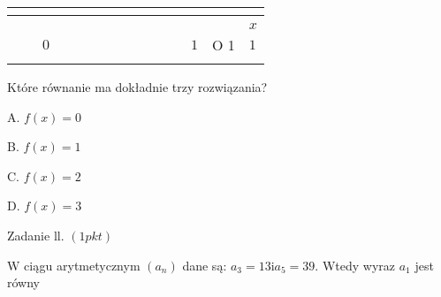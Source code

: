 \documentclass[a4paper,12pt]{article}
\begin{document}
\begin{center}
\begin{tabular}{|l|l|l|l|l|l|l|l|l|l|l|l|l|l|l|}
\hline
\multicolumn{1}{|l|}{}&	\multicolumn{1}{|l|}{}&	\multicolumn{1}{|l|}{}&	\multicolumn{1}{|l|}{}&	\multicolumn{1}{|l|}{}&	\multicolumn{1}{|l|}{}&	\multicolumn{1}{|l|}{}&	\multicolumn{1}{|l|}{}&	\multicolumn{1}{|l|}{}&	\multicolumn{1}{|l|}{}&	\multicolumn{1}{|l|}{}&	\multicolumn{1}{|l|}{}&	\multicolumn{1}{|l|}{}&	\multicolumn{1}{|l|}{}&	\multicolumn{1}{|l|}{}	\\
\hline
\multicolumn{1}{|l|}{}&	\multicolumn{1}{|l|}{}&	\multicolumn{1}{|l|}{}&	\multicolumn{1}{|l|}{}&	\multicolumn{1}{|l|}{}&	\multicolumn{1}{|l|}{}&	\multicolumn{1}{|l|}{}&	\multicolumn{1}{|l|}{}&	\multicolumn{1}{|l|}{}&	\multicolumn{1}{|l|}{}&	\multicolumn{1}{|l|}{}&	\multicolumn{1}{|l|}{}&	\multicolumn{1}{|l|}{}&	\multicolumn{1}{|l|}{}&	\multicolumn{1}{|l|}{}	\\
\hline
\multicolumn{1}{|l|}{}&	\multicolumn{1}{|l|}{}&	\multicolumn{1}{|l|}{}&	\multicolumn{1}{|l|}{}&	\multicolumn{1}{|l|}{}&	\multicolumn{1}{|l|}{}&	\multicolumn{1}{|l|}{}&	\multicolumn{1}{|l|}{}&	\multicolumn{1}{|l|}{}&	\multicolumn{1}{|l|}{}&	\multicolumn{1}{|l|}{}&	\multicolumn{1}{|l|}{}&	\multicolumn{1}{|l|}{}&	\multicolumn{1}{|l|}{}&	\multicolumn{1}{|l|}{ $x$}	\\
\hline
\multicolumn{1}{|l|}{}&	\multicolumn{1}{|l|}{}&	\multicolumn{1}{|l|}{ $0$}&	\multicolumn{1}{|l|}{}&	\multicolumn{1}{|l|}{}&	\multicolumn{1}{|l|}{}&	\multicolumn{1}{|l|}{}&	\multicolumn{1}{|l|}{}&	\multicolumn{1}{|l|}{}&	\multicolumn{1}{|l|}{}&	\multicolumn{1}{|l|}{}&	\multicolumn{1}{|l|}{}&	\multicolumn{1}{|l|}{ $1$}&	\multicolumn{1}{|l|}{O 1}&	\multicolumn{1}{|l|}{$1$}	\\
\hline
\multicolumn{1}{|l|}{}&	\multicolumn{1}{|l|}{}&	\multicolumn{1}{|l|}{}&	\multicolumn{1}{|l|}{}&	\multicolumn{1}{|l|}{}&	\multicolumn{1}{|l|}{}&	\multicolumn{1}{|l|}{}&	\multicolumn{1}{|l|}{}&	\multicolumn{1}{|l|}{}&	\multicolumn{1}{|l|}{}&	\multicolumn{1}{|l|}{}&	\multicolumn{1}{|l|}{}&	\multicolumn{1}{|l|}{}&	\multicolumn{1}{|l|}{}&	\multicolumn{1}{|l|}{}	\\
\hline
\end{tabular}

\end{center}
Które równanie ma dokładnie trzy rozwiązania?

A. $f(x)=0$

B. $f(x)=1$

C. $f(x)=2$

D. $f(x)=3$

Zadanie ll. $(1pkt)$

$\mathrm{W}$ ciągu arytmetycznym $(a_{n})$ dane są: $a_{3}=13\mathrm{i}a_{5}=39$. Wtedy wyraz $a_{1}$ jest równy
\end{document}
